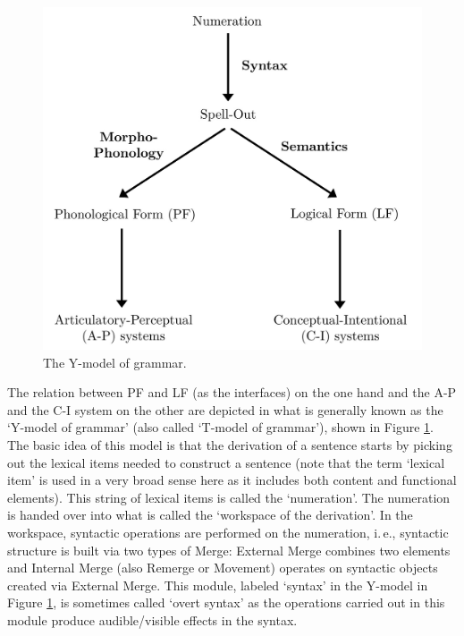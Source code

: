 \begin{figure}[bt]
\centering
	\includegraphics[width=1.0\textwidth]{ymodelsw.jpg}
	\caption{The Y-model of grammar.}
	\label{ymodel}
\end{figure}

The relation between PF and LF (as the interfaces) on the one hand and the A-P and the C-I system on the other are depicted in what is generally known as the `Y-model of grammar' (also called `T-model of grammar'), shown in Figure \ref{ymodel}. The basic idea of this model is that the derivation of a sentence starts by picking out the lexical items needed to construct a sentence (note that the term `lexical item' is used in a very broad sense here as it includes both content and functional elements). This string of lexical items is called the `numeration'. The numeration is handed over into what is called the `workspace of the derivation'. In the workspace, syntactic operations are performed on the numeration, i.\,e., syntactic structure is built via two types of Merge: External Merge combines two elements and Internal Merge (also Remerge or Movement) operates on syntactic objects created via External Merge. This module, labeled `syntax' in the Y-model in Figure \ref{ymodel}, is sometimes called `overt syntax' as the operations carried out in this module produce audible/visible effects in the syntax.

